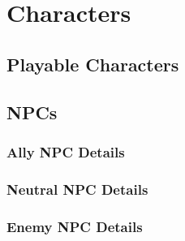 \section{\Large Characters}
    \subsection{\Large Playable Characters}
        
        
        
        
    \subsection{\Large NPCs}
        \subsubsection{\Large Ally NPC Details}
        \subsubsection{\Large Neutral NPC Details}
        \subsubsection{\Large Enemy NPC Details}